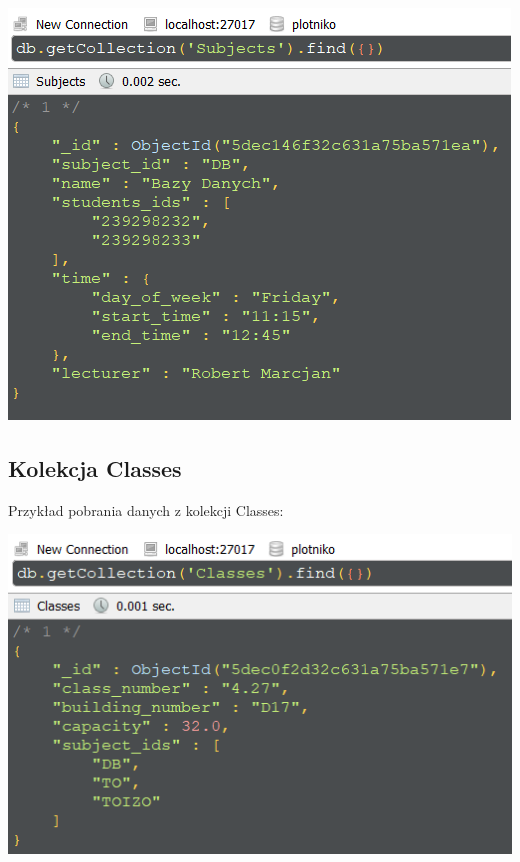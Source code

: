 \documentclass[a4paper, 11pt]{article}
\begin{document}
    \begin{center}
        \includegraphics[scale=0.8]{images/task7/Subjects.png}
    \end{center}

    \newpage

    \subsection{Kolekcja Classes}

    

    

    Przykład pobrania danych z kolekcji Classes:

    \begin{center}
        \includegraphics[scale=0.8]{images/task7/Classes.png}
    \end{center}
\end{document}
